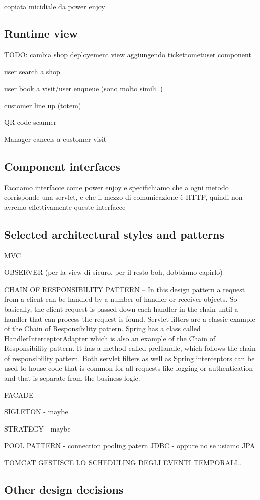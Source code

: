copiata micidiale da power enjoy

\subsection{Runtime view}
\label{subsect:runtimeview}

TODO: cambia shop deployement view aggiungendo tickettometuser component


user search a shop

user book a visit/user enqueue (sono molto simili..)

customer line up (totem)

QR-code scanner

Manager cancels a customer visit

\subsection{Component interfaces}
\label{subsect:componentinterfaces}

Facciamo interfacce come power enjoy e specifichiamo che a ogni metodo corrisponde una servlet, e che il mezzo di comunicazione è HTTP, quindi non avremo effettivamente queste interfacce

\subsection{Selected architectural styles and patterns}
\label{subsect:selectedarchitecturalstylesandpatterns}

MVC

OBSERVER (per la view di sicuro, per il resto boh, dobbiamo capirlo)

CHAIN OF RESPONSIBILITY PATTERN – In this design pattern a request from a client can be handled by a number of handler or receiver objects. So basically, the client request is passed down each handler in the chain until a handler that can process the request is found. Servlet filters are a classic example of the Chain of Responsibility pattern. Spring has a class called HandlerInterceptorAdapter which is also an example of the Chain of Responsibility pattern. It has a method called preHandle, which follows the chain of responsibility pattern. Both servlet filters as well as Spring interceptors can be used to house code that is common for all requests like logging or authentication and that is separate from the business logic.

FACADE

SIGLETON - maybe

STRATEGY - maybe

POOL PATTERN - connection pooling patern JDBC - oppure no se usiamo JPA

TOMCAT GESTISCE LO SCHEDULING DEGLI EVENTI TEMPORALI..

\subsection{Other design decisions}
\label{subsect:otherdesigndecisions}


